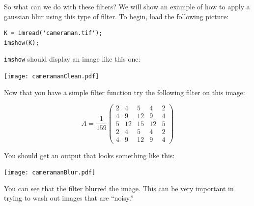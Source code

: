 So what can we do with these filters? We will show an example of how to apply a gaussian blur using this type of filter. To begin, load the following picture:

\begin{verbatim}
K = imread('cameraman.tif');
imshow(K);
\end{verbatim}

{\tt imshow} should display an image like this one:

\texttt{[image: cameramanClean.pdf]}

Now that you have a simple filter function try the following filter on this image:

\[
A = \frac{1}{159}\begin{pmatrix}
2&4&5&4&2\\
4&9&12&9&4\\
5&12&15&12&5\\
2&4&5&4&2\\
4&9&12&9&4
\end{pmatrix}
\]

You should get an output that looks something like this:

\texttt{[image: cameramanBlur.pdf]}

You can see that the filter blurred the image. This can be very important in trying to wash out images that are ``noisy.''


